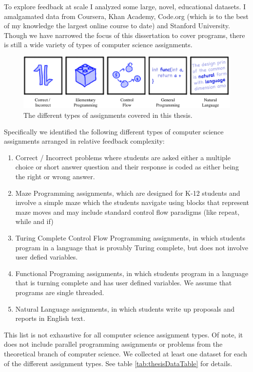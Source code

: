 To explore feedback at scale I analyzed some large, novel, educational
datasets. I amalgamated data from Coursera, Khan Academy, Code.org (which is to the
best of my knowledge the largest online course to date) and Stanford University. Though we have narrowed the focus of this dissertation to cover programs, there is still a wide variety of types of computer science assignments. 

\begin{figure}[t]
\center
\includegraphics[width=1.0\textwidth]{img/assnType_all}
\caption[Assignment types]{
The different types of assignments covered in this thesis.
\label{fig:assnTypes}
}
\end{figure}

Specifically we identified the following different types of computer science assignments arranged in relative feedback complexity: 
\begin{enumerate}
\item Correct / Incorrect problems where students are asked either a multiple choice or short answer question and their response is coded as either being the right or wrong answer. 
\item Maze Programming assignments, which are designed for K-12 students and involve a simple maze which the students navigate using blocks that represent maze moves and may include standard control flow paradigms (like repeat, while and if)
\item Turing Complete Control Flow Programming assignments, in which students program in a language that is provably Turing complete, but does not involve user defied variables.
\item Functional Programing assignments, in which students program in a language that is turning complete and has user defined variables. We assume that programs are single threaded.
\item Natural Language assignments, in which students write up proposals and reports in English text.	
\end{enumerate}

This list is not exhaustive for all computer science assignment types. Of note, it does not include parallel programming assignments or problems from the theoretical branch of computer science. We collected at least one dataset for each of the different assignment types. See table \ref{tab:thesisDataTable} for details. 

